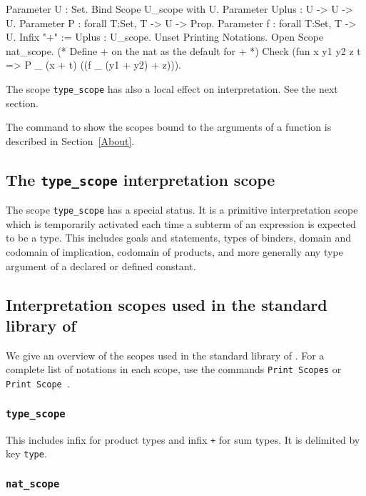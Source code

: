 \Example
\begin{coq_example}
Parameter U : Set.
Bind Scope U_scope with U.
Parameter Uplus : U -> U -> U.
Parameter P : forall T:Set, T -> U -> Prop.
Parameter f : forall T:Set, T -> U.
Infix "+" := Uplus : U_scope.
Unset Printing Notations.
Open Scope nat_scope. (* Define + on the nat as the default for + *)
Check (fun x y1 y2 z t => P _ (x + t) ((f _ (y1 + y2) + z))).
\end{coq_example}

\Rem The scope {\tt type\_scope} has also a local effect on
interpretation. See the next section.

\SeeAlso The command to show the scopes bound to the arguments of a
function is described in Section~\ref{About}.

\subsection[The {\tt type\_scope} interpretation scope]{The {\tt type\_scope} interpretation scope}

The scope {\tt type\_scope} has a special status. It is a primitive
interpretation scope which is temporarily activated each time a
subterm of an expression is expected to be a type. This includes goals
and statements, types of binders, domain and codomain of implication,
codomain of products, and more generally any type argument of a
declared or defined constant.

\subsection{Interpretation scopes used in the standard library of {\Coq}}

We give an overview of the scopes used in the standard library of
{\Coq}. For a complete list of notations in each scope, use the
commands {\tt Print Scopes} or {\tt Print Scope {\scope}}.

\subsubsection{\tt type\_scope}

This includes infix {\tt *} for product types and infix {\tt +} for
sum types. It is delimited by key {\tt type}.

\subsubsection{\tt nat\_scope}

